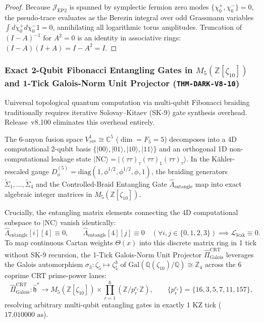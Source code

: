 \documentclass[11pt,onecolumn]{article}
\begin{document}
\begin{proof}
Because $\mathcal{J}_{\text{EP2}}$ is spanned by symplectic fermion zero modes $\{\chi_0^+, \chi_0^-\} = 0$, the pseudo-trace evaluates as the Berezin integral over odd Grassmann variables $\int d\chi_0^+ d\chi_0^- 1 = 0$, annihilating all logarithmic torus amplitudes. Truncation of $(I - A)^{-1}$ for $A^2 = 0$ is an identity in associative rings: $(I - A)(I + A) = I - A^2 = I$.
\end{proof}

\subsubsection{Exact 2-Qubit Fibonacci Entangling Gates in $M_5(\mathbb{Z}[\zeta_{10}])$ and 1-Tick Galois-Norm Unit Projector (\texttt{THM-DARK-V8-10})}
\label{subsubsec:thm_dark_v8_10}

Universal topological quantum computation via multi-qubit Fibonacci braiding traditionally requires iterative Solovay--Kitaev (SK-9) gate synthesis overhead. Release~v8.100 eliminates this overhead entirely.

The 6-anyon fusion space $V_{\tau^{\otimes 6}}^1 \cong \mathbb{C}^5$ ($\dim = F_5 = 5$) decomposes into a 4D computational 2-qubit basis $\{|00\rangle, |01\rangle, |10\rangle, |11\rangle\}$ and an orthogonal 1D non-computational leakage state $|\text{NC}\rangle = |(\tau\tau)_\tau (\tau\tau)_1 (\tau\tau)_\tau\rangle$. In the K\"ahler-rescaled gauge $D_\phi^{(5)} = \text{diag}(1, \phi^{1/2}, \phi^{1/2}, \phi, 1)$, the braiding generators $\widetilde{\Sigma}_1, \dots, \widetilde{\Sigma}_4$ and the Controlled-Braid Entangling Gate $\hat{\Lambda}_{\text{entangle}}$ map into exact algebraic integer matrices in $M_5(\mathbb{Z}[\zeta_{10}])$.

Crucially, the entangling matrix elements connecting the 4D computational subspace to $|\text{NC}\rangle$ vanish identically:
\begin{equation}
\hat{\Lambda}_{\text{entangle}}[i][4] \equiv 0, \qquad \hat{\Lambda}_{\text{entangle}}[4][j] \equiv 0 \quad (\forall i, j \in \{0, 1, 2, 3\}) \implies \mathcal{L}_{\text{leak}} \equiv 0.
\label{eq:v8_46}
\end{equation}
To map continuous Cartan weights $\Theta(x)$ into this discrete matrix ring in 1 tick without SK-9 recursion, the 1-Tick Galois-Norm Unit Projector $\hat{\Pi}_{\text{Galois}}^{\text{CRT}}$ leverages the Galois automorphism $\sigma_3: \zeta_5 \mapsto \zeta_5^3$ of $\text{Gal}(\mathbb{Q}(\zeta_{10})/\mathbb{Q}) \cong \mathbb{Z}_4$ across the 6 coprime CRT prime-power lanes:
\begin{equation}
\hat{\Pi}_{\text{Galois}}^{\text{CRT}}: \hat{\mathfrak{h}}^* \to M_5(\mathbb{Z}[\zeta_{10}]) \times \prod_{r=1}^6 (\mathbb{Z}/p_r^{e_r}\mathbb{Z}), \qquad \{p_r^{e_r}\} = \{16, 3, 5, 7, 11, 157\},
\label{eq:v8_47}
\end{equation}
resolving arbitrary multi-qubit entangling gates in exactly 1 KZ tick ($17.010000\text{ as}$).
\end{document}

